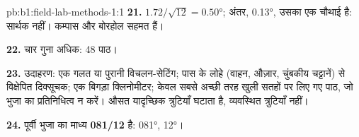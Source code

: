 \begin{solution}{pb:b1:field-lab-methods-1:1}
\textbf{21.} $1.72/\sqrt{12} = \ang{0.50}$; अंतर, \ang{0.13}, उसका एक चौथाई है: सार्थक नहीं। कम्पास और बोरहोल सहमत हैं।

\textbf{22.} चार गुना अधिक: 48 पाठ।

\textbf{23.} उदाहरण: एक गलत या पुरानी विचलन-सेटिंग; पास के लोहे (वाहन, औज़ार, चुंबकीय चट्टानें) से विक्षेपित दिक्सूचक; एक
बिगड़ा क्लिनोमीटर; केवल सबसे अच्छी तरह खुली सतहों पर लिए गए पाठ, जो भुजा का प्रतिनिधित्व न करें। औसत यादृच्छिक
त्रुटियाँ घटाता है, व्यवस्थित त्रुटियाँ नहीं।

\textbf{24.} पूर्वी भुजा का माध्य  \textbf{081/12} है:  \ang{081},  \ang{12}।
\end{solution}
